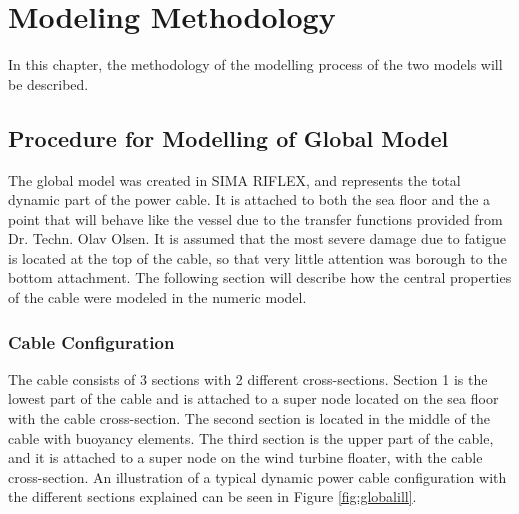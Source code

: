 \chapter{Modeling Methodology}
\label{chap:procedure}
In this chapter, the methodology of the modelling process of the two models will be described.
\section{Procedure for Modelling of Global Model}
\label{sec:globmod}
The global model was created in SIMA RIFLEX, and represents the total dynamic part of the power cable. It is attached to both the sea floor and the a point that will behave like the vessel due to the transfer functions provided from Dr. Techn. Olav Olsen. It is assumed that the most severe damage due to fatigue is located at the top of the cable, so that very little attention was borough to the bottom attachment. The following section will describe how the central properties of the cable were modeled in the numeric model. 

\subsection{Cable Configuration}
The cable consists of 3 sections with 2 different cross-sections. Section 1 is the lowest part of the cable and is attached to a super node located on the sea floor with the cable cross-section. The second section is located in the middle of the cable with buoyancy elements. The third section is the upper part of the cable, and it is attached to a super node on the wind turbine floater, with the cable cross-section. An illustration of a typical dynamic power cable configuration with the different sections explained can be seen in Figure \ref{fig:globalill}.\newline
\newline 

